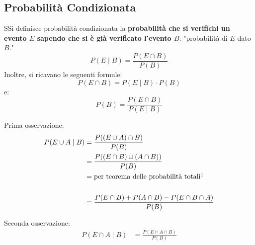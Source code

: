 \documentclass{article}  %
\theoremstyle{definition}
\begin{document}
\subsection{Probabilità Condizionata}
\begin{theorem}{}
	SSi definisce probabilità condizionata la \textbf{probabilità che si verifichi un evento $E$ sapendo che si è già verificato l'evento $B$}:
	"probabilità di $E$ dato $B$."
	\[
		P(E \mid B)=\frac{P(E \cap B)}{P(B)}
	\]
	Inoltre, si ricavano le seguenti formule:
	\[
		P(E \cap B)=P(E \mid B) \cdot P(B)
	\]
	e:
	\[
		P(B)=\frac{P(E \cap B)}{P(E \mid B)}
	\]
\end{theorem}
Prima osservazione:
\[
	\begin{aligned}
		P(E \cup A \mid B)
		 & = \frac{P((E \cup A)\cap B)}{P(B)}                         \\
		 & = \frac{P((E \cap B)\cup (A \cap B))}{P(B)}                \\
		 & = \text{per teorema delle probabilità totali}\footnotemark \\ \\
		 & = \frac{P(E \cap B)+P(A \cap B)-P(E \cap B \cap A)}{P(B)}
	\end{aligned}
\]

Seconda osservazione:
\[
	\begin{aligned}
		P(E \cap A \mid B)
		 & = \frac{P(E \cap A\cap B)}{P(B)}
	\end{aligned}
\]
\end{document}
